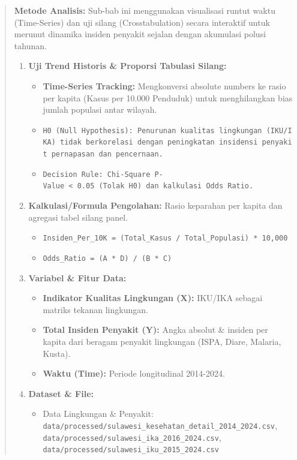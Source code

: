 \documentclass[
]{article}
\providecommand{\tightlist}{%
  \setlength{\itemsep}{0pt}\setlength{\parskip}{0pt}}
\begin{document}
\begin{quote}
\textbf{Metode Analisis:} Sub-bab ini menggunakan visualisasi runtut
waktu (Time-Series) dan uji silang (Crosstabulation) secara interaktif
untuk merunut dinamika insiden penyakit sejalan dengan akumulasi polusi
tahunan.

\begin{enumerate}
\def\labelenumi{\arabic{enumi}.}
\tightlist
\item
  \textbf{Uji Trend Historis \& Proporsi Tabulasi Silang:}

  \begin{itemize}
  \tightlist
  \item
    \textbf{Time-Series Tracking:} Mengkonversi absolute numbers ke
    rasio per kapita (Kasus per 10.000 Penduduk) untuk menghilangkan
    bias jumlah populasi antar wilayah.
  \item
    \texttt{H0\ (Null\ Hypothesis):\ Penurunan\ kualitas\ lingkungan\ (IKU/IKA)\ tidak\ berkorelasi\ dengan\ peningkatan\ insidensi\ penyakit\ pernapasan\ dan\ pencernaan.}
  \item
    \texttt{Decision\ Rule:\ Chi-Square\ P-Value\ \textless{}\ 0.05\ (Tolak\ H0)\ dan\ kalkulasi\ Odds\ Ratio.}
  \end{itemize}
\item
  \textbf{Kalkulasi/Formula Pengolahan:} Rasio keparahan per kapita dan
  agregasi tabel silang panel.

  \begin{itemize}
  \tightlist
  \item
    \texttt{Insiden\_Per\_10K\ =\ (Total\_Kasus\ /\ Total\_Populasi)\ *\ 10,000}
  \item
    \texttt{Odds\_Ratio\ =\ (A\ *\ D)\ /\ (B\ *\ C)}
  \end{itemize}
\item
  \textbf{Variabel \& Fitur Data:}

  \begin{itemize}
  \tightlist
  \item
    \textbf{Indikator Kualitas Lingkungan (X):} IKU/IKA sebagai matriks
    tekanan lingkungan.
  \item
    \textbf{Total Insiden Penyakit (Y):} Angka absolut \& insiden per
    kapita dari beragam penyakit lingkungan (ISPA, Diare, Malaria,
    Kusta).
  \item
    \textbf{Waktu (Time):} Periode longitudinal 2014-2024.
  \end{itemize}
\item
  \textbf{Dataset \& File:}

  \begin{itemize}
  \tightlist
  \item
    Data Lingkungan \& Penyakit:
    \texttt{data/processed/sulawesi\_kesehatan\_detail\_2014\_2024.csv},
    \texttt{data/processed/sulawesi\_ika\_2016\_2024.csv},
    \texttt{data/processed/sulawesi\_iku\_2015\_2024.csv}
  \end{itemize}
\end{enumerate}
\end{quote}
\end{document}
